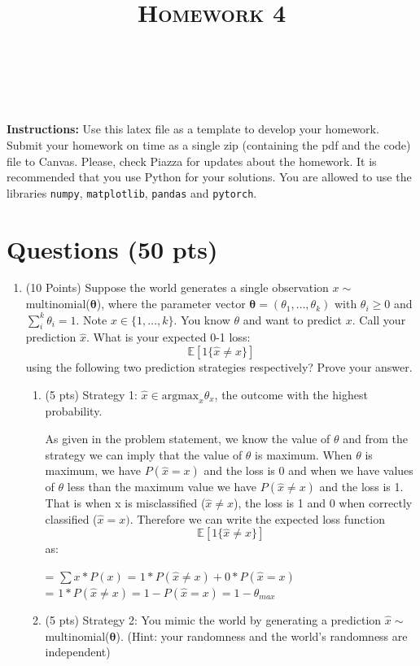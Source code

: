 \documentclass[a4paper]{article}
\title{\textsc{Homework 4}} %
\author{
\red{MADHUSHREE  NIJAGAL} \\
\red{9084490524}\\
}
\date{}
\theoremstyle{definition}
\renewcommand\vec[1]{\boldsymbol{#1}}
\def\E{\mathbb E}
\newenvironment{soln}{
    \leavevmode\color{blue}\ignorespaces
}{}
\begin{document}
\maketitle 


\textbf{Instructions:} 
Use this latex file as a template to develop your homework.
Submit your homework on time as a single zip (containing the pdf and the code) file to Canvas. Please, check Piazza for updates about the homework. It is recommended that you use Python for your solutions. You are allowed to use the libraries {\tt {\tt numpy}}, {\tt matplotlib}, {\tt pandas} and {\tt pytorch}.
\section{Questions (50 pts)}
\begin{enumerate}
\item (10 Points)
Suppose the world generates a single observation $ x\sim$ multinomial($\vec \theta$), where the parameter vector $ \vec \theta = (\theta_1, \ldots , \theta_k)$ with $\theta_i\geq 0$ and $\sum_i^k\theta_i = 1$. Note $x \in \{1, \ldots, k\}$. You know $\theta$ and want to predict $x$. Call your prediction $\hat x$. What is your expected 0-1 loss: 
\[\E[1\{\hat{x} \neq x\}]\] 
using the following two prediction strategies respectively? Prove your answer. 
\begin{enumerate}
    \item (5 pts) Strategy 1: $\hat x \in \mathrm{argmax}_x\theta_x $, the outcome with the highest probability.  \\
    \begin{soln}  
	As given in the problem statement, we know the value of $\theta$ and from the strategy we can imply that the value of $\theta$ is maximum. When $\theta$ is maximum, we have $P(\hat x = x)$ and the loss is 0 and when we have values of $\theta$ less than the maximum value we have $P(\hat x \neq x)$ and the loss is 1. That is when x is misclassified ($\hat x \neq x$), the loss is 1 and 0 when correctly classified ($\hat x = x)$. Therefore we can write the expected loss function \[\E[1\{\hat{x} \neq x\}]\] as:
	\begin{center}
	 	  = $\sum x* P(x)$ = $1*P(\hat x \neq x) + 0*P(\hat x = x) $ \\
		  = $1*P(\hat x \neq x) = 1 - P(\hat x = x) = 1 - \theta_{max} $ \\
	\end{center}
     \end{soln}
    \item (5 pts) Strategy 2: You mimic the world by generating a prediction $ \hat{x}\sim$ multinomial($\vec \theta$). (Hint: your randomness and the world’s randomness are independent) 

\end{enumerate}
\end{enumerate}
\end{document}
